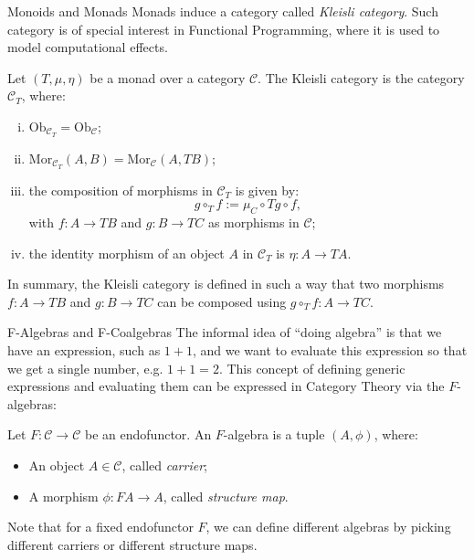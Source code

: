 \documentclass[aspectratio=169,xcolor=dvipsnames,10pt]{beamer}
\theoremstyle{definition}
\begin{document}
\begin{frame}[fragile]{Monoids and Monads}
    Monads induce a category called \textit{Kleisli category}. Such category is of special interest
    in Functional Programming, where it is used to model computational effects.

    \begin{definition}
        Let $(T, \mu, \eta)$ be a monad over a category $\mathcal C$. The Kleisli category
        is the category $\mathcal C_T$, where:
        \begin{enumerate}[(i)]
        \item $\text{Ob}_{\mathcal C_T} = \text{Ob}_{\mathcal C}$;
        \item $\text{Mor}_{\mathcal C_T}(A,B) = \text{Mor}_{\mathcal C}(A,TB)$;
        \item the composition of morphisms in $\mathcal C_T$ is given by:
            \begin{displaymath}
                g \circ_T f :=  \mu_C \circ T g \circ f,
            \end{displaymath}
        with $f:A \to T B$ and $g:B \to T C$ as morphisms in $\mathcal C$;
        \item the identity morphism of an object $A$ in $\mathcal C_T$ is $\eta:A\to TA$.
        \end{enumerate}
        In summary, the Kleisli category is defined in such a way that two morphisms
        $f:A \to TB$ and $g:B \to TC$ can be composed using $g \circ_T f:A \to TC$.
    \end{definition}
\end{frame}

\begin{frame}[fragile]{F-Algebras and F-Coalgebras}
    The informal idea of ``doing algebra'' is that we have an expression,
    such as $1 + 1$, and we want to evaluate this expression so that we
    get a single number, e.g. $1 + 1 = 2$. This concept of defining generic
    expressions and evaluating them can be expressed in Category Theory
    via the $F$-algebras:

    \begin{definition}[$F$-algebra]
        Let $F:\mathcal C \to \mathcal C$ be an endofunctor. An $F$-algebra is a tuple $(A,\phi)$, where:
        \begin{itemize}
            \item An object $A \in \mathcal C$, called \textit{carrier};
            \item A morphism $\phi : FA \to A$, called \textit{structure map}.
        \end{itemize}
    \end{definition}

    Note that for a fixed endofunctor $F$, we can define different algebras by picking
    different carriers or different structure maps.
\end{frame}
\end{document}
